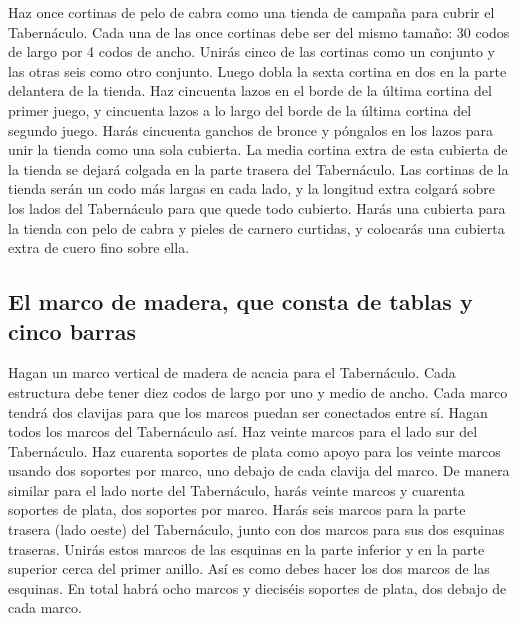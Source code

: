  Haz once cortinas de pelo de cabra como una tienda de
campaña para cubrir el Tabernáculo.  Cada una de las once
cortinas debe ser del mismo tamaño: 30 codos de largo por 4 codos de
ancho.  Unirás cinco de las cortinas como un conjunto y
las otras seis como otro conjunto. Luego dobla la sexta cortina en dos
en la parte delantera de la tienda.  Haz cincuenta lazos
en el borde de la última cortina del primer juego, y cincuenta lazos a
lo largo del borde de la última cortina del segundo juego.
 Harás cincuenta ganchos de bronce y póngalos en los
lazos para unir la tienda como una sola cubierta.  La
media cortina extra de esta cubierta de la tienda se dejará colgada en
la parte trasera del Tabernáculo.  Las cortinas de la
tienda serán un codo más largas en cada lado, y la longitud extra
colgará sobre los lados del Tabernáculo para que quede todo cubierto.
 Harás una cubierta para la tienda con pelo de cabra y
pieles de carnero curtidas, y colocarás una cubierta extra de cuero fino
sobre ella.

\hypertarget{el-marco-de-madera-que-consta-de-tablas-y-cinco-barras}{%
\subsection{El marco de madera, que consta de tablas y cinco
barras}\label{el-marco-de-madera-que-consta-de-tablas-y-cinco-barras}}

 Hagan un marco vertical de madera de acacia para el
Tabernáculo.  Cada estructura debe tener diez codos de
largo por uno y medio de ancho.  Cada marco tendrá dos
clavijas para que los marcos puedan ser conectados entre sí. Hagan todos
los marcos del Tabernáculo así.  Haz veinte marcos para
el lado sur del Tabernáculo.  Haz cuarenta soportes de
plata como apoyo para los veinte marcos usando dos soportes por marco,
uno debajo de cada clavija del marco.  De manera similar
para el lado norte del Tabernáculo, harás veinte marcos 
y cuarenta soportes de plata, dos soportes por marco. 
Harás seis marcos para la parte trasera (lado oeste) del Tabernáculo,
 junto con dos marcos para sus dos esquinas traseras.
 Unirás estos marcos de las esquinas en la parte inferior
y en la parte superior cerca del primer anillo. Así es como debes hacer
los dos marcos de las esquinas.  En total habrá ocho
marcos y dieciséis soportes de plata, dos debajo de cada marco.


